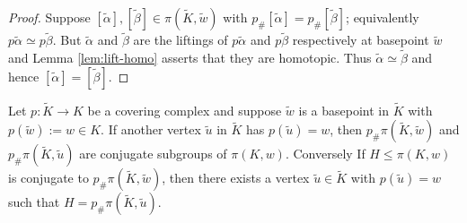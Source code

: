 \begin{proof}
  Suppose $[\tilde{\alpha}],[\tilde{\beta}] \in \pi(\tilde{K},\tilde{w})$ with $p_{\#}[\tilde{\alpha}] = p_{\#}[\tilde{\beta}]$; equivalently $p\tilde{\alpha} \simeq p\tilde{\beta}$. But $\tilde{\alpha}$ and $\tilde{\beta}$ are the liftings of $p\tilde{\alpha}$ and $p\tilde{\beta}$ respectively at basepoint $\tilde{w}$ and Lemma \ref{lem:lift-homo} asserts that they are homotopic. Thus $\tilde{\alpha} \simeq \tilde{\beta}$ and hence $[\tilde{\alpha}] = [\tilde{\beta}]$.
\end{proof}

\begin{theorem}
  \label{thm:conj}
  Let $p: \tilde{K} \rightarrow K$ be a covering complex and suppose $\tilde{w}$ is a basepoint in $\tilde{K}$ with $p(\tilde{w}) := w \in K$. If another vertex $\tilde{u}$ in $\tilde{K}$ has $p(\tilde{u}) = w$, then $p_{\#}\pi(\tilde{K},\tilde{w})$ and $p_{\#}\pi(\tilde{K},\tilde{u})$ are conjugate subgroups of $\pi(K,w)$. Conversely If $H \leq \pi(K,w)$ is conjugate to $p_{\#}\pi(\tilde{K},\tilde{w})$, then there exists a vertex $\tilde{u} \in \tilde{K}$ with $p(\tilde{u}) = w$ such that $H = p_{\#}\pi(\tilde{K},\tilde{u})$.
\end{theorem}

